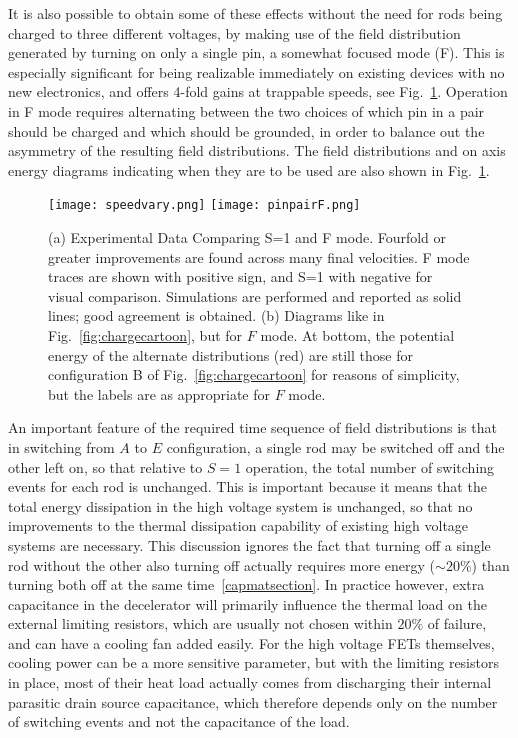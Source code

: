 It is also possible to obtain some of these effects without the need for rods being charged to three different voltages, by making use of the field distribution generated by turning on only a single pin, a somewhat focused mode (F).
This is especially significant for being realizable immediately on existing devices with no new electronics, and offers 4-fold gains at trappable speeds, see Fig.~\ref{fig:speedvary}.
Operation in F mode requires alternating between the two choices of which pin in a pair should be charged and which should be grounded, in order to balance out the asymmetry of the resulting field distributions.
The field distributions and on axis energy diagrams indicating when they are to be used are also shown in Fig.~\ref{fig:speedvary}.

\begin{figure}[t!]
\centering
\texttt{[image: speedvary.png]}\hspace{4mm}
\texttt{[image: pinpairF.png]}%
\caption[S=1 and F Mode Comparison]{\label{fig:speedvary}
(a) Experimental Data Comparing S=1 and F mode. Fourfold or greater improvements are found across many final velocities. F mode traces are shown with positive sign, and S=1 with negative for visual comparison. Simulations are performed and reported as solid lines; good agreement is obtained.
(b) Diagrams like in Fig.~\ref{fig:chargecartoon}, but for $F$ mode. At bottom, the potential energy of the alternate distributions (red) are still those for configuration B of Fig.~\ref{fig:chargecartoon} for reasons of simplicity, but the labels are as appropriate for $F$ mode.
}
\end{figure}

An important feature of the required time sequence of field distributions is that in switching from $A$ to $E$ configuration, a single rod may be switched off and the other left on, so that relative to $S=1$ operation, the total number of switching events for each rod is unchanged.
This is important because it means that the total energy dissipation in the high voltage system is unchanged, so that no improvements to the thermal dissipation capability of existing high voltage systems are necessary.
This discussion ignores the fact that turning off a single rod without the other also turning off actually requires more energy ($\sim 20\%$) than turning both off at the same time~\ref{capmatsection}. 
In practice however, extra capacitance in the decelerator will primarily influence the thermal load on the external limiting resistors, which are usually not chosen within $20\%$ of failure, and can have a cooling fan added easily.
For the high voltage FETs themselves, cooling power can be a more sensitive parameter, but with the limiting resistors in place, most of their heat load actually comes from discharging their internal parasitic drain source capacitance, which therefore depends only on the number of switching events and not the capacitance of the load.


